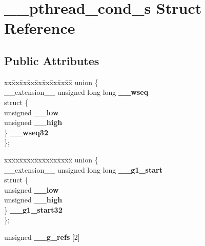 \hypertarget{struct____pthread__cond__s}{}\section{\+\_\+\+\_\+pthread\+\_\+cond\+\_\+s Struct Reference}
\label{struct____pthread__cond__s}
\subsection*{Public Attributes}
\begin{DoxyCompactItemize}
\item 
\begin{tabbing}
xx\=xx\=xx\=xx\=xx\=xx\=xx\=xx\=xx\=\kill
union \{\\
\>\_\_extension\_\_ unsigned long long {\bfseries \_\_wseq}\\
\>struct \{\\
\>\>unsigned {\bfseries \_\_low}\\
\>\>unsigned {\bfseries \_\_high}\\
\>\} {\bfseries \_\_wseq32}\\
\}; \hypertarget{struct____pthread__cond__s_a5813d6f5a41e3128b965dd10b6b18ecf}{}\label{struct____pthread__cond__s_a5813d6f5a41e3128b965dd10b6b18ecf}
\\

\end{tabbing}\item 
\begin{tabbing}
xx\=xx\=xx\=xx\=xx\=xx\=xx\=xx\=xx\=\kill
union \{\\
\>\_\_extension\_\_ unsigned long long {\bfseries \_\_g1\_start}\\
\>struct \{\\
\>\>unsigned {\bfseries \_\_low}\\
\>\>unsigned {\bfseries \_\_high}\\
\>\} {\bfseries \_\_g1\_start32}\\
\}; \hypertarget{struct____pthread__cond__s_afb2a2cad230bc9811b46add924be6550}{}\label{struct____pthread__cond__s_afb2a2cad230bc9811b46add924be6550}
\\

\end{tabbing}\item 
unsigned {\bfseries \+\_\+\+\_\+g\+\_\+refs} \mbox{[}2\mbox{]}\hypertarget{struct____pthread__cond__s_ace507152b841b832bc4bdaf8f0c2b827}{}\label{struct____pthread__cond__s_ace507152b841b832bc4bdaf8f0c2b827}


\end{DoxyCompactItemize}

